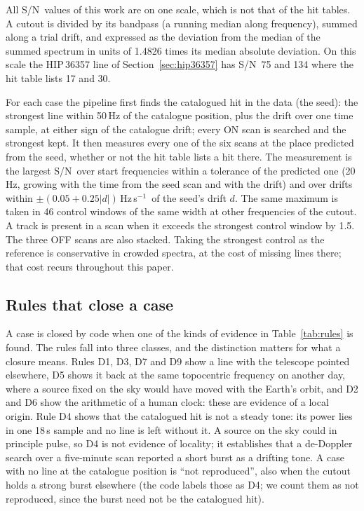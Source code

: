 \documentclass[twocolumn]{aastex631}
\newcommand{\hzs}{Hz\,s$^{-1}$}
\newcommand{\sn}{S/N}
\begin{document}
All \sn\ values of this work are on one scale, which is not that of the hit
tables. A cutout is divided by its bandpass (a running median along
frequency), summed along a trial drift, and expressed as the deviation from
the median of the summed spectrum in units of 1.4826 times its median
absolute deviation. On this scale the HIP\,36357 line of
Section~\ref{sec:hip36357} has \sn\ 75 and 134 where the hit table lists 17
and 30.

For each case the pipeline first finds the catalogued hit in the data (the
seed): the strongest line within 50\,Hz of the catalogue position, plus the
drift over one time sample, at either sign of the catalogue drift; every ON
scan is searched and the strongest kept. It then measures every one of the
six scans at the place predicted from the seed, whether or not the hit
table lists a hit there. The measurement is the largest \sn\ over start
frequencies within a tolerance of the predicted one (20\,Hz, growing with
the time from the seed scan and with the drift) and over drifts within
$\pm(0.05+0.25|d|)$\,\hzs\ of the seed's drift $d$. The same maximum is
taken in 46 control windows of the same width at other frequencies of the
cutout. A track is present in a scan when it exceeds the strongest control
window by 1.5. The three OFF scans are also stacked. Taking the strongest
control as the reference is conservative in crowded spectra, at the cost of
missing lines there; that cost recurs throughout this paper.

\subsection{Rules that close a case} \label{sec:rules}

A case is closed by code when one of the kinds of evidence in
Table~\ref{tab:rules} is found. The rules fall into three classes, and the
distinction matters for what a closure means. Rules D1, D3, D7 and D9
show a line with the telescope pointed elsewhere, D5 shows it back at the
same topocentric frequency on another day, where a source fixed on the sky
would have moved with the Earth's orbit, and D2 and D6 show the
arithmetic of a human clock: these are evidence of a local origin. Rule D4
shows that the catalogued hit is not a steady tone: its power lies in one
18\,s sample and no line is left without it. A source on the sky could in principle pulse, so D4 is not
evidence of locality; it establishes that a de-Doppler search over a
five-minute scan reported a short burst as a drifting tone. A case with no
line at the catalogue position is ``not reproduced'', also when the cutout
holds a strong burst elsewhere (the code labels those as D4; we count them
as not reproduced, since the burst need not be the catalogued hit).
\end{document}
